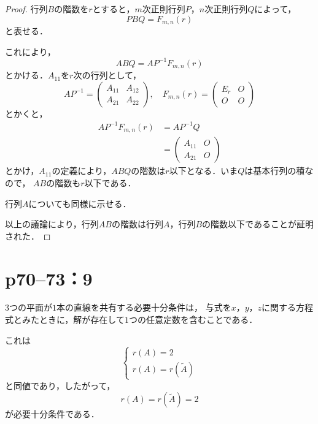 \documentclass[a4paper,10pt,fleqn]{ltjsarticle}
\begin{document}
\begin{leftbar}
  \begin{proof}
    行列$B$の階数を$r$とすると，$m$次正則行列$P$，$n$次正則行列$Q$によって，
    \[
      P B Q = F_{m,n} (r)
    \]
    と表せる．

    これにより，
    \[
      ABQ = A P^{-1} F_{m,n} (r)
    \]
    とかける．$A_{11}$を$r$次の行列として，
    \[
      A P^{-1} = \begin{pmatrix} A_{11} & A_{12} \\ A_{21} & A_{22} \end{pmatrix}, \quad F_{m,n} (r) = \begin{pmatrix} E_r & O \\ O & O \end{pmatrix}
    \]
    とかくと，
    \begin{align*}
      A P^{-1} F_{m,n} (r) & = A P^{-1} Q                                            \\
                           & = \begin{pmatrix} A_{11}& O \\ A_{21} & O \end{pmatrix}
    \end{align*}
    とかけ，$A_{11}$の定義により，$ABQ$の階数は$r$以下となる．いま$Q$は基本行列の積なので， $AB$の階数も$r$以下である．

    行列$A$についても同様に示せる．

    以上の議論により，行列$AB$の階数は行列$A$，行列$B$の階数以下であることが証明された．

  \end{proof}
\end{leftbar}

\newpage


\section*{p70--73：9}

\begin{tleftbar}
  $3$つの平面が$1$本の直線を共有する必要十分条件は，
  与式を$x$，$y$，$z$に関する方程式とみたときに，解が存在して$1$つの任意定数を含むことである．

  これは
  \[
    \begin{cases}
      r(A)=2 \\
      r(A)=r(\tilde{A})
    \end{cases}
  \]
  と同値であり，したがって，
  \[
    r(A)=r(\tilde{A})=2
  \]
  が必要十分条件である．
\end{tleftbar}
\end{document}
